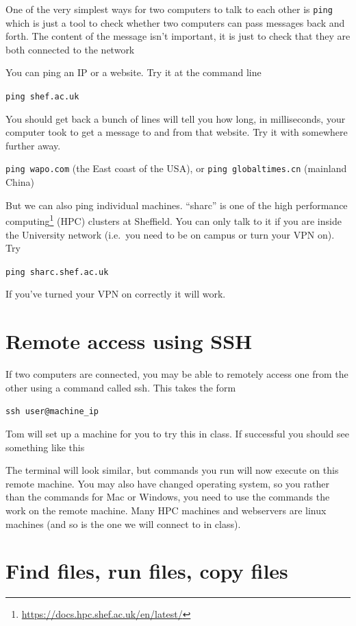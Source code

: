 \documentclass[
  12pt,
  a5paper,
]{book}
\DeclareRobustCommand{\href}[2]{#2\footnote{\url{#1}}}
\begin{document}
One of the very simplest ways for two computers to talk to each other is \texttt{ping} which is just a tool to check whether two computers can pass messages back and forth. The content of the message isn't important, it is just to check that they are both connected to the network

You can ping an IP or a website. Try it at the command line

\texttt{ping\ shef.ac.uk}

You should get back a bunch of lines will tell you how long, in milliseconds, your computer took to get a message to and from that website. Try it with somewhere further away.

\texttt{ping\ wapo.com} (the East coast of the USA), or \texttt{ping\ globaltimes.cn} (mainland China)

But we can also ping individual machines. ``sharc'' is one of the \href{https://docs.hpc.shef.ac.uk/en/latest/}{high performance computing} (HPC) clusters at Sheffield. You can only talk to it if you are inside the University network (i.e.~you need to be on campus or turn your VPN on). Try

\texttt{ping\ sharc.shef.ac.uk}

If you've turned your VPN on correctly it will work.

\hypertarget{remote-access-using-ssh}{%
\section{Remote access using SSH}\label{remote-access-using-ssh}}

If two computers are connected, you may be able to remotely access one from the other using a command called ssh. This takes the form

\texttt{ssh\ user@machine\_ip}

Tom will set up a machine for you to try this in class. If successful you should see something like this

The terminal will look similar, but commands you run will now execute on this remote machine. You may also have changed operating system, so you rather than the commands for Mac or Windows, you need to use the commands the work on the remote machine. Many HPC machines and webservers are linux machines (and so is the one we will connect to in class).

\hypertarget{find-files-run-files-copy-files}{%
\section{Find files, run files, copy files}\label{find-files-run-files-copy-files}}
\end{document}
